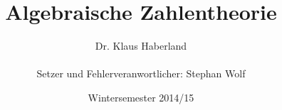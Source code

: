 \documentclass{article}
\begin{document}
	
	\title{Algebraische Zahlentheorie}
	\author{Dr. Klaus Haberland\\\\Setzer und Fehlerveranwortlicher: Stephan Wolf}
	\date{Wintersemester 2014/15}
	
	\maketitle
	\tableofcontents
	\newpage
	
	\newpage
	

	\newpage
	\setlength{\parfillskip}{0pt plus 1fil}
	\printindex
\end{document}
